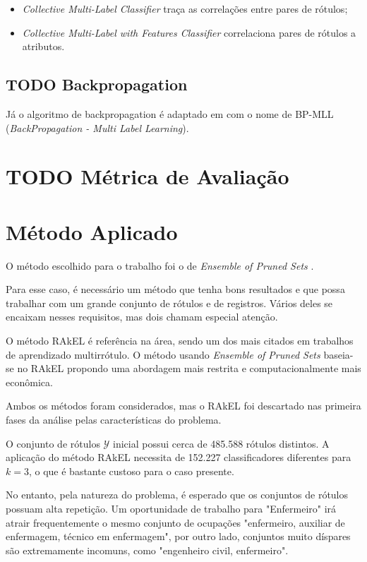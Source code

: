 \documentclass[runningheads,a4paper]{llncs}
\begin{document}
\begin{itemize}
	\item \textit{Collective Multi-Label Classifier} traça as correlações entre pares de rótulos;
	\item \textit{Collective Multi-Label with Features Classifier} correlaciona pares de rótulos a atributos.	
\end{itemize}

\subsection{TODO Backpropagation}

Já o algoritmo de backpropagation é adaptado em \cite{Zhang2006-vf} com o nome de BP-MLL (\textit{BackPropagation - Multi Label Learning}).


\section{TODO Métrica de Avaliação}

\section{Método Aplicado} \label{sec:justificativa}

O método escolhido para o trabalho foi o de \textit{Ensemble of Pruned Sets} \cite{Read2008-bt}.

Para esse caso, é necessário um método que tenha bons resultados e que possa trabalhar com um grande conjunto de rótulos e de registros. Vários deles se encaixam nesses requisitos, mas dois chamam especial atenção.

O método RAkEL \cite{Tsoumakas2007-wm} é referência na área, sendo um dos mais citados em trabalhos de aprendizado multirrótulo. O método usando \textit{Ensemble of Pruned Sets} baseia-se no RAkEL propondo uma abordagem mais restrita e computacionalmente mais econômica.

Ambos os métodos foram considerados, mas o RAkEL foi descartado nas primeira fases da análise pelas características do problema.

O conjunto de rótulos $\mathcal{Y}$ inicial possui cerca de 485.588 rótulos distintos. A aplicação do método RAkEL \cite{Tsoumakas2007-wm} necessita de 152.227 classificadores diferentes para $k=3$, o que é bastante custoso para o caso presente.

No entanto, pela natureza do problema, é esperado que os conjuntos de rótulos possuam alta repetição. Um oportunidade de trabalho para "Enfermeiro" irá atrair frequentemente o mesmo conjunto de ocupações "enfermeiro, auxiliar de enfermagem, técnico em enfermagem", por outro lado, conjuntos muito díspares são extremamente incomuns, como "engenheiro civil, enfermeiro".
\end{document}
